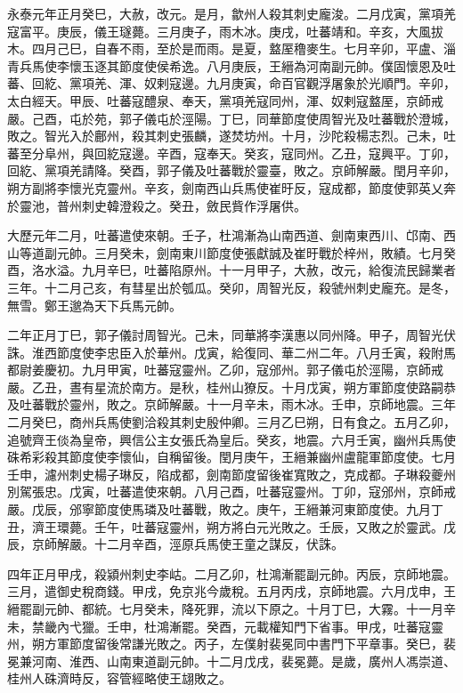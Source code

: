 \begin{pinyinscope}
 永泰元年正月癸巳，大赦，改元。是月，歙州人殺其刺史龐浚。二月戊寅，黨項羌寇富平。庚辰，儀王璲薨。三月庚子，雨木冰。庚戌，吐蕃靖和。辛亥，大風拔木。四月己巳，自春不雨，至於是而雨。是夏，盩厔穞麥生。七月辛卯，平盧、淄青兵馬使李懷玉逐其節度使侯希逸。八月庚辰，王縉為河南副元帥。僕固懷恩及吐蕃、回紇、黨項羌、渾、奴剌寇邊。九月庚寅，命百官觀浮屠象於光順門。辛卯，太白經天。甲辰、吐蕃寇醴泉、奉天，黨項羌寇同州，渾、奴剌寇盩厔，京師戒嚴。己酉，屯於苑，郭子儀屯於涇陽。丁巳，同華節度使周智光及吐蕃戰於澄城，敗之。智光入於鄜州，殺其刺史張麟，遂焚坊州。十月，沙陀殺楊志烈。己未，吐蕃至分阜州，與回紇寇邊。辛酉，寇奉天。癸亥，寇同州。乙丑，寇興平。丁卯，回紇、黨項羌請降。癸酉，郭子儀及吐蕃戰於靈臺，敗之。京師解嚴。閏月辛卯，朔方副將李懷光克靈州。辛亥，劍南西山兵馬使崔旴反，寇成都，節度使郭英乂奔於靈池，普州刺史韓澄殺之。癸丑，斂民貲作浮屠供。



 大歷元年二月，吐蕃遣使來朝。壬子，杜鴻漸為山南西道、劍南東西川、邙南、西山等道副元帥。三月癸未，劍南東川節度使張獻誠及崔旴戰於梓州，敗績。七月癸酉，洛水溢。九月辛巳，吐蕃陷原州。十一月甲子，大赦，改元，給復流民歸業者三年。十二月己亥，有彗星出於瓠瓜。癸卯，周智光反，殺虢州刺史龐充。是冬，無雪。鄭王邈為天下兵馬元帥。



 二年正月丁巳，郭子儀討周智光。己未，同華將李漢惠以同州降。甲子，周智光伏誅。淮西節度使李忠臣入於華州。戊寅，給復同、華二州二年。八月壬寅，殺附馬都尉姜慶初。九月甲寅，吐蕃寇靈州。乙卯，寇邠州。郭子儀屯於涇陽，京師戒嚴。乙丑，晝有星流於南方。是秋，桂州山獠反。十月戊寅，朔方軍節度使路嗣恭及吐蕃戰於靈州，敗之。京師解嚴。十一月辛未，雨木冰。壬申，京師地震。三年二月癸巳，商州兵馬使劉洽殺其刺史殷仲卿。三月乙巳朔，日有食之。五月乙卯，追號齊王倓為皇帝，興信公主女張氏為皇后。癸亥，地震。六月壬寅，幽州兵馬使硃希彩殺其節度使李懷仙，自稱留後。閏月庚午，王縉兼幽州盧龍軍節度使。七月壬申，濾州刺史楊子琳反，陷成都，劍南節度留後崔寬敗之，克成都。子琳殺夔州別駕張忠。戊寅，吐蕃遣使來朝。八月己酉，吐蕃寇靈州。丁卯，寇邠州，京師戒嚴。戊辰，邠寧節度使馬璘及吐蕃戰，敗之。庚午，王縉兼河東節度使。九月丁丑，濟王環薨。壬午，吐蕃寇靈州，朔方將白元光敗之。壬辰，又敗之於靈武。戊辰，京師解嚴。十二月辛酉，涇原兵馬使王童之謀反，伏誅。



 四年正月甲戌，殺潁州刺史李岵。二月乙卯，杜鴻漸罷副元帥。丙辰，京師地震。三月，遣御史稅商錢。甲戌，免京兆今歲稅。五月丙戌，京師地震。六月戊申，王縉罷副元帥、都統。七月癸未，降死罪，流以下原之。十月丁巳，大霧。十一月辛未，禁畿內弋獵。壬申，杜鴻漸罷。癸酉，元載權知門下省事。甲戌，吐蕃寇靈州，朔方軍節度留後常謙光敗之。丙子，左僕射裴冕同中書門下平章事。癸巳，裴冕兼河南、淮西、山南東道副元帥。十二月戊戌，裴冕薨。是歲，廣州人馮崇道、桂州人硃濟時反，容管經略使王翃敗之。




\end{pinyinscope}
